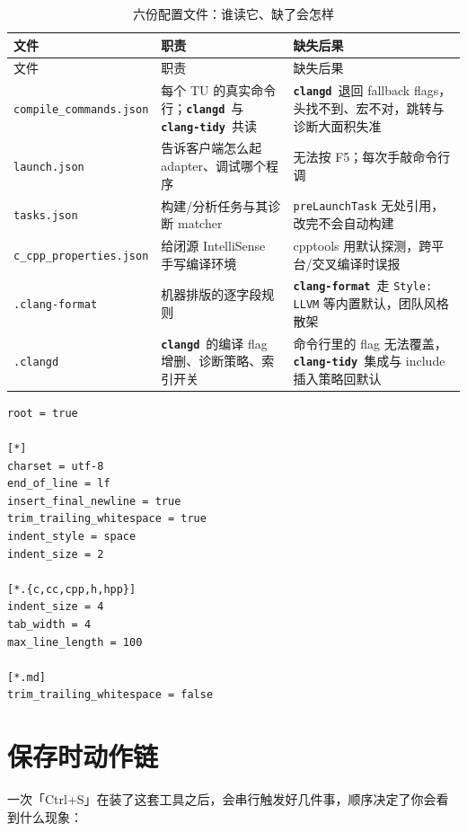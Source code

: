 \documentclass[12pt,a4paper,fontset=fandol]{ctexbook}
\newcommand{\Lib}[1]{\textbf{\texttt{#1}}}
\newcommand{\Tidy}{\Lib{clang-tidy}}
\newcommand{\Fmt}{\Lib{clang-format}}
\newcommand{\CD}{\Lib{clangd}}
\begin{document}
{\small\setlength{\tabcolsep}{3pt}
\begin{longtable}{>{\raggedright\arraybackslash}p{} >{\raggedright\arraybackslash}p{} >{\raggedright\arraybackslash}p{}}
\caption{六份配置文件：谁读它、缺了会怎样}\label{tab:ch07-files}\\
\toprule
文件 & 职责 & 缺失后果 \\
\midrule
\endfirsthead
\toprule
文件 & 职责 & 缺失后果 \\
\midrule
\endhead
\bottomrule
\endfoot
\texttt{compile\_commands.json} & 每个 TU 的真实命令行；\CD\ 与 \Tidy\ 共读 & \CD\ 退回 fallback flags，头找不到、宏不对，跳转与诊断大面积失准 \\
\texttt{launch.json} & 告诉客户端怎么起 adapter、调试哪个程序 & 无法按 F5；每次手敲命令行调 \\
\texttt{tasks.json} & 构建/分析任务与其诊断 matcher & \texttt{preLaunchTask} 无处引用，改完不会自动构建 \\
\texttt{c\_cpp\_properties.json} & 给闭源 IntelliSense 手写编译环境 & cpptools 用默认探测，跨平台/交叉编译时误报 \\
\texttt{.clang-format} & 机器排版的逐字段规则 & \Fmt\ 走 \texttt{Style: LLVM} 等内置默认，团队风格散架 \\
\texttt{.clangd} & \CD\ 的编译 flag 增删、诊断策略、索引开关 & 命令行里的 flag 无法覆盖，\Tidy\ 集成与 include 插入策略回默认 \\
\end{longtable}}

\begin{lstlisting}[style=yamlstyle,caption={一份与 .clang-format 分工清晰的 .editorconfig},label={lst:ch07-editorconfig}]
root = true

[*]
charset = utf-8
end_of_line = lf
insert_final_newline = true
trim_trailing_whitespace = true
indent_style = space
indent_size = 2

[*.{c,cc,cpp,h,hpp}]
indent_size = 4
tab_width = 4
max_line_length = 100

[*.md]
trim_trailing_whitespace = false
\end{lstlisting}

\section{保存时动作链}\label{sec:ch07-s6}

一次「Ctrl+S」在装了这套工具之后，会串行触发好几件事，顺序决定了你会看到什么现象：
\end{document}
